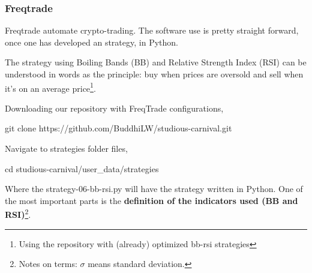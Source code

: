 \documentclass[
12pt,				%
openright,			%
oneside,			%
a4paper,			%
brazil,				%
english,			%
]{abntex2}
\begin{document}




\subsubsection{Freqtrade}

Freqtrade automate crypto-trading. The software use is pretty straight
forward, once one has developed an strategy, in Python.

The strategy using Boiling Bands (BB) and Relative Strength Index
(RSI) can be understood in words as the principle: buy when prices are
oversold and sell when it's on an average price\footnote{Using the repository with (already) optimized bb-rsi strategies}.

Downloading our repository with FreqTrade configurations,
\begin{shell}
git clone https://github.com/BuddhiLW/studious-carnival.git
\end{shell}

Navigate to strategies folder files,
\begin{shell}
cd studious-carnival/user_data/strategies
\end{shell}

Where the strategy-06-bb-rsi.py will have the strategy written in Python. One of the most important parts is the \textbf{definition of the indicators used (BB and RSI)}\footnote{Notes on terms: $\sigma$ means standard deviation.}.
\end{document}
